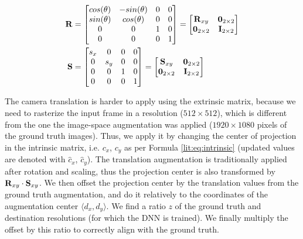 \begin{align}
	\bmr{R} &= \begin{bmatrix} 
		cos(\theta) & -sin(\theta) & 0 & 0 \\
		sin(\theta) & cos(\theta)  & 0 & 0 \\
		0           & 0            & 1 & 0 \\
		0           & 0            & 0 & 1 \\
	\end{bmatrix} = \begin{bmatrix} 
		\bmr{R}_{xy}         & \bmr{0}_{2 \times 2} \\
		\bmr{0}_{2 \times 2} & \bmr{I}_{2 \times 2} \\
	\end{bmatrix}\\%
	\bmr{S} &= \begin{bmatrix} 
		s_x         & 0            & 0 & 0 \\
		0           & s_y          & 0 & 0 \\
		0           & 0            & 1 & 0 \\
		0           & 0            & 0 & 1 \\
	\end{bmatrix} = \begin{bmatrix} 
		\bmr{S}_{xy}         & \bmr{0}_{2 \times 2} \\
		\bmr{0}_{2 \times 2} & \bmr{I}_{2 \times 2} \\
	\end{bmatrix}\label{methods:eq:cam-aug-scale-rot}
\end{align}

%	
%	

The camera translation is harder to apply using the extrinsic matrix, because we need to rasterize the input frame in a resolution ($512\times512$), which is different from the one the image-space augmentation was applied ($1920\times1080$ pixels of the ground truth images). Thus, we apply it by changing the center of projection in the intrinsic matrix, i.e. $c_x$, $c_y$ as per Formula \ref{lit:eq:intrinsic} (updated values are denoted with $\hat{c}_x$, $\hat{c}_y$). The translation augmentation is traditionally applied after rotation and scaling, thus the projection center is also transformed by $\bm{\mathrm{R}}_{xy} \cdot \bm{\mathrm{S}}_{xy}$. We then offset the projection center by the translation values from the ground truth augmentation, and do it relatively to the coordinates of the augmentation center $\langle d_x, d_y \rangle$. We find a ratio $z$ of the ground truth and destination resolutions (for which the DNN is trained). We finally multiply the offset by this ratio to correctly align with the ground truth.
 
